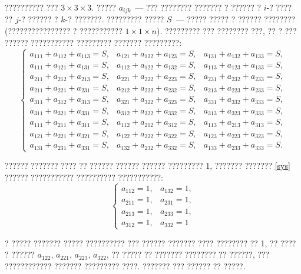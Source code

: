 \documentclass[12pt, a4paper]{article}
\begin{document}

?????????? ??? $3\times3\times 3$. ????? $a_{ijk}$~--- ??? ???????? ??????? ? ?????? ? $i$-? ???? ?? $j$-? ?????? ? $k$-? ???????. ????????? ????? $S$~--- ????? ????? ? ?????? ???????? (???????????????? ? ??????????? $1\times1\times n$). ????????? ??? ???????? ???, ?? ? ??? ?????? ??????????? ????????? ??????? ?????????:
\begin{equation}\label{sys}
\left\{ \begin{array}{lll}
a_{111} + a_{112} + a_{113} = S,& a_{121} + a_{122} + a_{123} = S,&
a_{131} + a_{132} + a_{133} = S,\\
a_{111} + a_{121} + a_{131} = S,& a_{112} + a_{122} + a_{132} = S,&
a_{113} + a_{123} + a_{133} = S,\\
a_{211} + a_{212} + a_{213} = S,& a_{221} + a_{222} + a_{223} = S,&
a_{231} + a_{232} + a_{233} = S,\\ 
a_{211} + a_{221} + a_{231} = S,& a_{212} + a_{222} + a_{232} = S,&
a_{213} + a_{223} + a_{233} = S,\\
a_{311} + a_{312} + a_{313} = S,& a_{321} + a_{322} + a_{323} = S,&
a_{331} + a_{332} + a_{333} = S,\\ 
a_{311} + a_{321} + a_{331} = S,& a_{312} + a_{322} + a_{332} = S,&
a_{313} + a_{323} + a_{333} = S,\\
a_{111} + a_{211} + a_{311} = S,& a_{112} + a_{212} + a_{312} = S,&
a_{113} + a_{213} + a_{313} = S,\\ 
a_{121} + a_{221} + a_{321} = S,& a_{122} + a_{222} + a_{322} = S,&
a_{123} + a_{223} + a_{323} = S,\\
a_{131} + a_{231} + a_{331} = S,& a_{132} + a_{232} + a_{332} = S,&
a_{133} + a_{233} + a_{333} = S.
\end{array}\right.
\end{equation}

?????? ??????? ???? ?? ?????? ?????? ?????? ????????? 1, ??????? ??????? \eqref{sys} ?????? ??????????? ?????????? ???????????:
\begin{equation}\label{sys2}
\left\{\begin{array}{ll}
a_{112} = 1,& a_{132} = 1,\\ 
a_{211} = 1,& a_{231} = 1,\\ 
a_{213} = 1,& a_{233} = 1,\\
a_{312} = 1,& a_{332} = 1
\end{array}
\right.
\end{equation}

? ????? ??????? ????? ?????????? ??? ?????? ??????? ???? ???????? ?? 1, ?? ???? ? ?????? $a_{122}$, $a_{221}$, $a_{223}$, $a_{322}$, ?? ????? ?? ??????? ???????? ?? ??????, ??? ???????????? ??????? ????????? ????. ??????? ??? ?????? ?? ?????.
\end{document}
